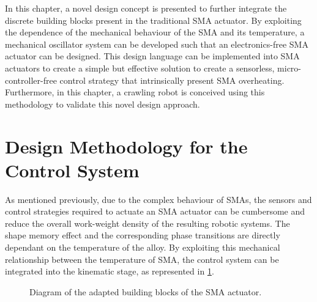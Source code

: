 In this chapter, a novel design concept is presented to further integrate the discrete building blocks present in the traditional SMA actuator. By exploiting the dependence of the mechanical behaviour of the SMA and its temperature, a mechanical oscillator system can be developed such that an electronics-free SMA actuator can be designed. This design language can be implemented into SMA actuators to create a simple but effective solution to create a sensorless, micro-controller-free control strategy that intrinsically present SMA overheating. Furthermore, in this chapter, a crawling robot is conceived using this methodology to validate this novel design approach.

\section{Design Methodology for the Control System}
As mentioned previously, due to the complex behaviour of SMAs, the sensors and control strategies required to actuate an SMA actuator can be cumbersome and reduce the overall work-weight density of the resulting robotic systems. The shape memory effect and the corresponding phase transitions are directly dependant on the temperature of the alloy. By exploiting this mechanical relationship between the temperature of SMA, the control system can be integrated into the kinematic stage, as represented in \cref{fig:building-blocks-ct}.

\begin{figure}[h] %
  \centering
  \caption{Diagram of the adapted building blocks of the SMA actuator.}
  \label{fig:building-blocks-ct}
\end{figure}

